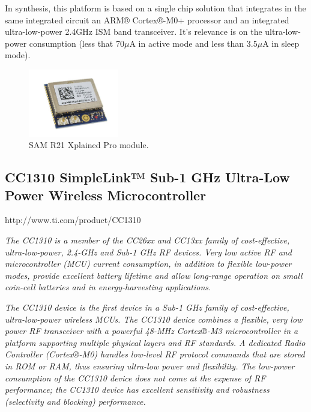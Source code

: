 In synthesis, this platform is based on a single chip solution that integrates in the same integrated circuit an ARM® Cortex®-M0+ processor and an integrated ultra-low-power 2.4GHz ISM
band transceiver. It's relevance is on the ultra-low-power consumption (less that 70$\mu$A in active mode and less than 3.5$\mu$A in sleep mode).

\begin{figure}[h!]
	\centering
	\includegraphics[width=0.35\textwidth,keepaspectratio]{figures/samr21}
	\caption{SAM R21 Xplained Pro module.}

\end{figure}


\subsection{CC1310 SimpleLink™ Sub-1 GHz Ultra-Low Power Wireless Microcontroller}

\begin{framed}
	
	http://www.ti.com/product/CC1310
	
	\vspace{1em}
	\vspace{1em}
\small	
	\textit{The CC1310 is a member of the CC26xx and CC13xx family of cost-effective, ultra-low-power, 2.4-GHz and Sub-1 GHz RF devices. Very low active RF and microcontroller (MCU) current consumption, in addition to flexible low-power modes, provide excellent battery lifetime and allow long-range operation on small coin-cell batteries and in energy-harvesting applications.}
		
	\textit{The CC1310 device is the first device in a Sub-1 GHz family of cost-effective, ultra-low-power wireless MCUs. The CC1310 device combines a flexible, very low power RF transceiver with a powerful 48-MHz Cortex®-M3 microcontroller in a platform supporting multiple physical layers and RF standards. A dedicated Radio Controller (Cortex®-M0) handles low-level RF protocol commands that are stored in ROM or RAM, thus ensuring ultra-low power and flexibility. The low-power consumption of the CC1310 device does not come at the expense of RF performance; the CC1310 device has excellent sensitivity and robustness (selectivity and blocking) performance.}
		
\end{framed}




